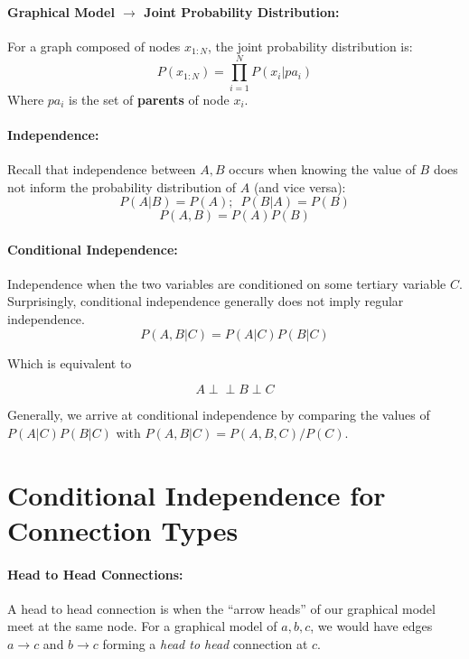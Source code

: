 \documentclass[a4paper,12pt]{report}
\begin{document}
\paragraph{Graphical Model $\to$ Joint Probability Distribution: } For a graph composed of nodes $x_{1:N}$, the joint probability distribution is:
\begin{equation}
P(x_{1:N}) = \prod_{i=1}^N P(x_i | pa_i)
\end{equation}
Where $pa_i$ is the set of \textbf{parents} of node $x_i$.


\paragraph{Independence: } Recall that independence between $A,B$ occurs when knowing the value of $B$ does not inform the probability distribution of $A$ (and vice versa):
\begin{equation}
P(A|B) = P(A); \,\,\, P(B|A) = P(B)
\end{equation}
\begin{equation}
P(A,B)= P(A)P(B)
\end{equation}
\paragraph{Conditional Independence: } Independence when the two variables are conditioned on some tertiary variable $C$. Surprisingly, conditional independence generally does not imply regular independence.
\begin{equation}
P(A,B|C) = P(A|C)P(B|C)
\end{equation}

Which is equivalent to 

\newcommand\ci{\perp\!\!\!\perp}

\begin{equation}
A \ci B \perp C
\end{equation}

Generally, we arrive at conditional independence by comparing the values of $P(A|C)P(B|C)$ with $P(A,B|C) = P(A,B,C)/P(C)$.


\section{Conditional Independence for Connection Types}

\paragraph{Head to Head Connections: } A head to head connection is when the ``arrow heads'' of our graphical model meet at the same node. For a graphical model of $a,b,c$, we would have edges $a\to c$ and $b\to c$ forming a \textit{head to head} connection at $c$.
\end{document}
